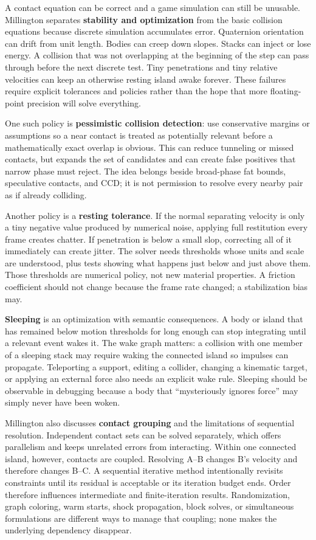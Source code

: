A contact equation can be correct and a game simulation can still be unusable. Millington separates \textbf{stability and optimization} from the basic collision equations because discrete simulation accumulates error. Quaternion orientation can drift from unit length. Bodies can creep down slopes. Stacks can inject or lose energy. A collision that was not overlapping at the beginning of the step can pass through before the next discrete test. Tiny penetrations and tiny relative velocities can keep an otherwise resting island awake forever. These failures require explicit tolerances and policies rather than the hope that more floating-point precision will solve everything.

One such policy is \textbf{pessimistic collision detection}: use conservative margins or assumptions so a near contact is treated as potentially relevant before a mathematically exact overlap is obvious. This can reduce tunneling or missed contacts, but expands the set of candidates and can create false positives that narrow phase must reject. The idea belongs beside broad-phase fat bounds, speculative contacts, and CCD; it is not permission to resolve every nearby pair as if already colliding.

Another policy is a \textbf{resting tolerance}. If the normal separating velocity is only a tiny negative value produced by numerical noise, applying full restitution every frame creates chatter. If penetration is below a small slop, correcting all of it immediately can create jitter. The solver needs thresholds whose units and scale are understood, plus tests showing what happens just below and just above them. Those thresholds are numerical policy, not new material properties. A friction coefficient should not change because the frame rate changed; a stabilization bias may.

\textbf{Sleeping} is an optimization with semantic consequences. A body or island that has remained below motion thresholds for long enough can stop integrating until a relevant event wakes it. The wake graph matters: a collision with one member of a sleeping stack may require waking the connected island so impulses can propagate. Teleporting a support, editing a collider, changing a kinematic target, or applying an external force also needs an explicit wake rule. Sleeping should be observable in debugging because a body that ``mysteriously ignores force'' may simply never have been woken.

Millington also discusses \textbf{contact grouping} and the limitations of sequential resolution. Independent contact sets can be solved separately, which offers parallelism and keeps unrelated errors from interacting. Within one connected island, however, contacts are coupled. Resolving A--B changes B's velocity and therefore changes B--C. A sequential iterative method intentionally revisits constraints until its residual is acceptable or its iteration budget ends. Order therefore influences intermediate and finite-iteration results. Randomization, graph coloring, warm starts, shock propagation, block solves, or simultaneous formulations are different ways to manage that coupling; none makes the underlying dependency disappear.

